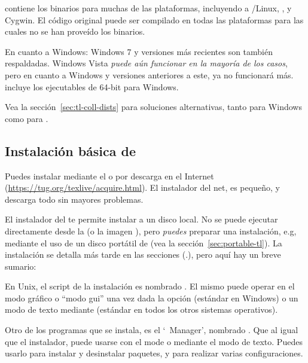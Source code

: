 \documentclass{article}
\begin{document}
\TL{} contiene los binarios para muchas de las plataformas, incluyendo
a \GNU/Linux, \macOS, y Cygwin. El código original puede ser
compilado en todas las plataformas para las cuales no se han proveído
los binarios.

En cuanto a Windows: Windows 7 y versiones más recientes son también
respaldadas. Windows Vista \emph{puede aún funcionar en la mayoría de
los casos}, pero en cuanto a Windows  y versiones anteriores
a este, \TL{} ya no funcionará más. \TL{} incluye los ejecutables de
64-bit para Windows.

Vea la sección~\ref{sec:tl-coll-dists} para soluciones alternativas,
tanto para Windows como para \macOS.

\subsection{Instalación básica de \protect\TL{}}
\label{sec:basic}

Puedes instalar \TL{} mediante el \DVD{} o por descarga en el Internet
(\url{https://tug.org/texlive/acquire.html}). El instalador del net, es
pequeño, y descarga todo sin mayores problemas. 

El instalador del \DVD{} te permite instalar a un disco local. No se
puede ejecutar directamente \TL{} desde la \TK{} \DVD{} (o la
imagen ), pero \emph{puedes} preparar una instalación, e.g,
mediante el uso de un disco portátil de \USB{} (vea la
sección~\ref{sec:portable-tl}). La instalación se detalla más tarde en
las secciones (\p.\pageref{sec:install}), pero aquí hay un breve
sumario:

\begin{itemize*}

\item En Unix, el script de la instalación es nombrado
.
	El mismo puede operar en el modo gráfico o ``modo gui'' una
	vez dada la opción  (estándar en Windows)
	o un modo de texto mediante 
	(estándar en todos los otros sistemas operativos).

\item Otro de los programas que se instala, es el `\TL\ Manager', nombrado
	. Que al igual que el instalador, puede usarse con el mode
	\GUI{} o mediante el modo de texto. Puedes usarlo para instalar
	y desinstalar paquetes, y para realizar varias configuraciones.

\end{itemize*}
\end{document}
